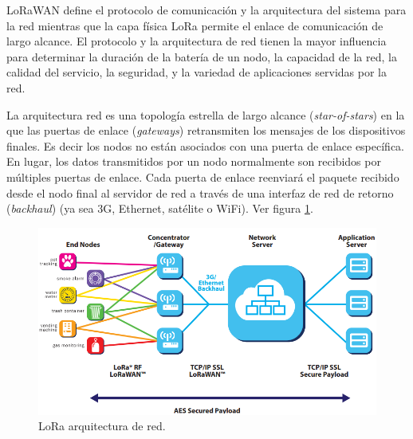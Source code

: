 
LoRaWAN define el protocolo de comunicación y la arquitectura del sistema para la red mientras que la capa física LoRa permite el enlace de comunicación de largo alcance.
El protocolo y la arquitectura de red tienen la mayor influencia para determinar la duración de la batería de un nodo, la capacidad de la red, la calidad del servicio, la seguridad, y la variedad de aplicaciones servidas por la red. 

La arquitectura red es una topología estrella de largo alcance (\textit{star-of-stars}) en la que las puertas de enlace (\textit{gateways}) retransmiten los mensajes de los dispositivos finales. Es decir los nodos no están asociados con una puerta de enlace específica. En lugar, los datos transmitidos por un nodo normalmente son recibidos por múltiples puertas de enlace. Cada puerta de enlace reenviará el paquete recibido desde el nodo final al servidor de red a través de una interfaz de red de retorno (\textit{backhaul}) (ya sea 3G, Ethernet, satélite o WiFi). Ver figura \ref{fig:Loraarquitecturenetwork}.

\begin{figure}[h]
	\centering
	\includegraphics[scale=.70]{./Figures/Loraarquitecturenetwork.PNG}
	\caption{LoRa arquitectura de red\protect\footnotemark.}
	\label{fig:Loraarquitecturenetwork}
\end{figure}

